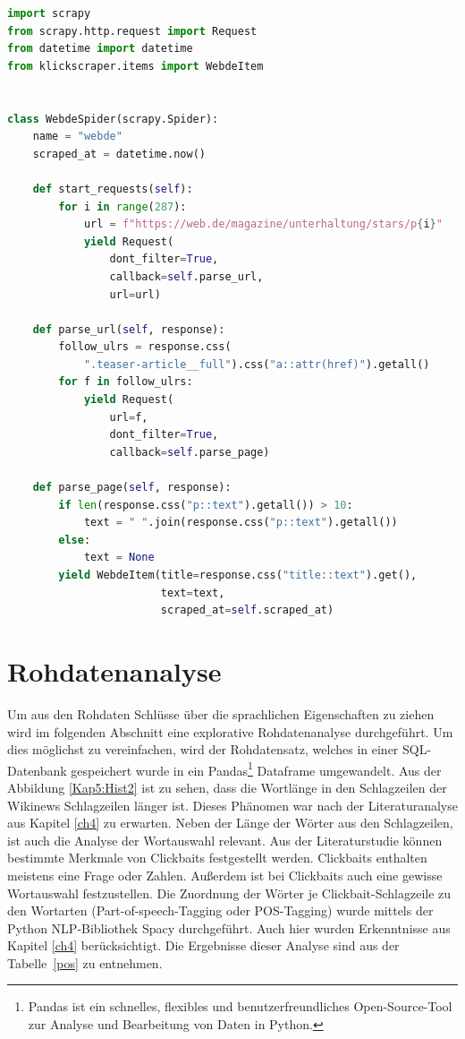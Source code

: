 \begin{lstlisting}[language=Python,caption=Beispiel eines Scrapers,label={Scrapy}]
import scrapy
from scrapy.http.request import Request
from datetime import datetime
from klickscraper.items import WebdeItem


class WebdeSpider(scrapy.Spider):
    name = "webde"
    scraped_at = datetime.now()

    def start_requests(self):
        for i in range(287):
            url = f"https://web.de/magazine/unterhaltung/stars/p{i}"
            yield Request(
                dont_filter=True,
                callback=self.parse_url,
                url=url)

    def parse_url(self, response):
        follow_ulrs = response.css(
            ".teaser-article__full").css("a::attr(href)").getall()
        for f in follow_ulrs:
            yield Request(
                url=f,
                dont_filter=True,
                callback=self.parse_page)

    def parse_page(self, response):
        if len(response.css("p::text").getall()) > 10:
            text = " ".join(response.css("p::text").getall())
        else:
            text = None
        yield WebdeItem(title=response.css("title::text").get(),
                        text=text,
                        scraped_at=self.scraped_at)
\end{lstlisting}


\section{Rohdatenanalyse}
Um aus den Rohdaten Schlüsse über die sprachlichen Eigenschaften zu ziehen wird im folgenden Abschnitt eine explorative Rohdatenanalyse durchgeführt. Um dies möglichst zu vereinfachen, wird der Rohdatensatz, welches in einer SQL-Datenbank gespeichert wurde in ein Pandas\footnote{Pandas ist ein schnelles, flexibles und benutzerfreundliches Open-Source-Tool zur Analyse und Bearbeitung von Daten in Python.} Dataframe umgewandelt.
Aus der Abbildung \ref{Kap5:Hist2} ist zu sehen, dass die Wortlänge in den Schlagzeilen der Wikinews Schlagzeilen länger ist. Dieses Phänomen war nach der Literaturanalyse aus Kapitel \ref{ch4} zu erwarten. Neben der Länge der Wörter aus den Schlagzeilen, ist auch die Analyse der Wortauswahl relevant. Aus der Literaturstudie können bestimmte Merkmale von Clickbaits festgestellt werden. Clickbaits enthalten meistens eine Frage oder Zahlen. Außerdem ist bei Clickbaits auch eine gewisse Wortauswahl festzustellen. Die Zuordnung der Wörter je Clickbait-Schlagzeile zu den Wortarten (Part-of-speech-Tagging oder POS-Tagging) wurde mittels der Python NLP-Bibliothek Spacy durchgeführt. Auch hier wurden Erkenntnisse aus Kapitel \ref{ch4} berücksichtigt. Die Ergebnisse dieser Analyse sind aus der Tabelle~\ref{pos} zu entnehmen.

